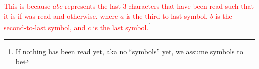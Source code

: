 \textcolor{red}{
    This is because $abc$ represents the last 3 characters that have been read such that it is  if  was read and  otherwise. where $a$ is the third-to-last symbol, $b$ is the second-to-last symbol, and $c$ is the last symbol.\footnote{If nothing has been read yet, aka no ``symbols'' yet, we assume symbols to be }
}